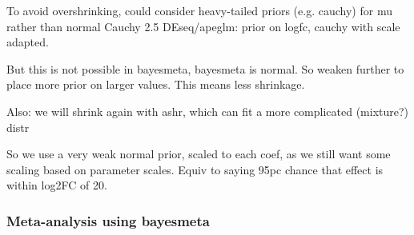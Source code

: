 \begin{outline}
\1 To avoid overshrinking, could consider heavy-tailed priors (e.g. cauchy) for mu rather than normal
    \2 Cauchy 2.5
    \2 DEseq/apeglm: prior on logfc, cauchy with scale adapted.

\1 But this is not possible in bayesmeta, bayesmeta is normal. So weaken further to place more prior on larger values. This means less shrinkage.

\1 Also: we will shrink again with ashr, which can fit a more complicated (mixture?) distr

\1 So we use a very weak normal prior, scaled to each coef, as we still want some scaling based on parameter scales.
    \2 Equiv to saying 95pc chance that effect is within log2FC of 20.


\end{outline}

\subsubsection{Meta-analysis using bayesmeta}

